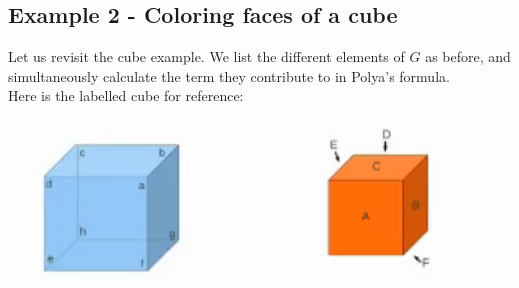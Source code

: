 \subsection{Example 2 - Coloring faces of a cube}
Let us revisit the cube example. We list the different elements of $G$ as before, and simultaneously calculate the term they contribute to in Polya's formula.
\\
Here is the labelled cube for reference:
\\
\includegraphics[]{./images/cube.png}
\\
